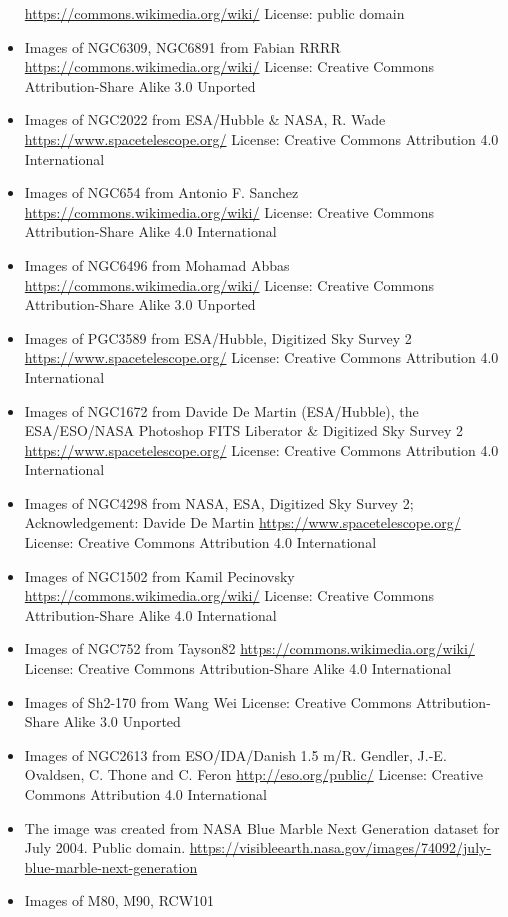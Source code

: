 \begin{itemize}
	 \url{https://commons.wikimedia.org/wiki/}
	 License: public domain 
\item Images of NGC6309, NGC6891 from Fabian RRRR
	 \url{https://commons.wikimedia.org/wiki/}
	 License: Creative Commons Attribution-Share Alike 3.0 Unported
\item Images of NGC2022 from ESA/Hubble \& NASA, R. Wade
	 \url{https://www.spacetelescope.org/}
	 License: Creative Commons Attribution 4.0 International
\item Images of NGC654 from Antonio F. Sanchez
	 \url{https://commons.wikimedia.org/wiki/}
	 License: Creative Commons Attribution-Share Alike 4.0 International
\item Images of NGC6496
	 from Mohamad Abbas
	 \url{https://commons.wikimedia.org/wiki/}
	 License: Creative Commons Attribution-Share Alike 3.0 Unported
\item Images of PGC3589
	 from ESA/Hubble, Digitized Sky Survey 2
	 \url{https://www.spacetelescope.org/}
	 License: Creative Commons Attribution 4.0 International
\item Images of NGC1672
	 from Davide De Martin (ESA/Hubble), the ESA/ESO/NASA Photoshop FITS Liberator \& Digitized Sky Survey 2
	 \url{https://www.spacetelescope.org/}
	 License: Creative Commons Attribution 4.0 International
\item Images of NGC4298
	 from NASA, ESA, Digitized Sky Survey 2; Acknowledgement: Davide De Martin
	 \url{https://www.spacetelescope.org/}
	 License: Creative Commons Attribution 4.0 International
\item Images of NGC1502
	 from Kamil Pecinovsky
	 \url{https://commons.wikimedia.org/wiki/}
	 License: Creative Commons Attribution-Share Alike 4.0 International
\item Images of NGC752
	 from Tayson82
	 \url{https://commons.wikimedia.org/wiki/}
	 License: Creative Commons Attribution-Share Alike 4.0 International
\item Images of Sh2-170
	 from Wang Wei
	 License: Creative Commons Attribution-Share Alike 3.0 Unported
\item Images of NGC2613
	 from ESO/IDA/Danish 1.5 m/R. Gendler, J.-E. Ovaldsen, C. Thone and C. Feron
	 \url{http://eso.org/public/}
	 License: Creative Commons Attribution 4.0 International
\item The  image was created from NASA Blue Marble Next Generation
	 dataset for July 2004. Public domain.
	 \url{https://visibleearth.nasa.gov/images/74092/july-blue-marble-next-generation}
\item Images of M80, M90, RCW101

\end{itemize}
